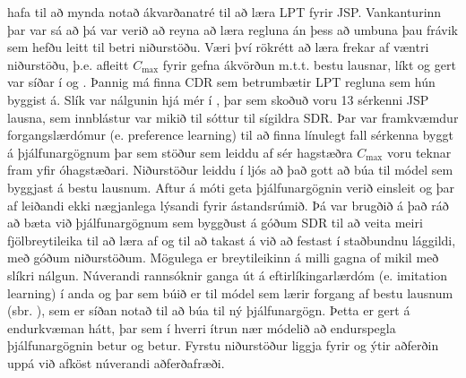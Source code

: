 \documentclass[10pt,a4paper]{article}
\begin{document}
\citet{Siggi05} hafa til að mynda notað ákvarðanatré til að læra LPT fyrir 
JSP. 
Vankanturinn þar var sá að þá var verið að reyna að læra regluna án þess að 
umbuna þau frávik sem hefðu leitt til betri niðurstöðu. 
Væri því rökrétt að læra frekar af væntri niðurstöðu, þ.e. afleitt $C_{\max}$ 
fyrir gefna ákvörðun m.t.t. bestu lausnar, líkt og gert var síðar í 
\cite{Malik08,Russell09} og \cite{Siggi10}. Þannig má finna CDR sem betrumbætir 
LPT regluna sem hún byggist á. 
Slík var nálgunin hjá mér í \cite{InRu15a}, þar 
sem skoðuð voru 13 sérkenni JSP lausna, sem innblástur var mikið til sóttur til 
sígildra SDR. Þar var framkvæmdur forgangslærdómur (e. preference learning) 
til að finna línulegt fall sérkenna byggt á þjálfunargögnum þar sem stöður sem 
leiddu af sér hagstæðra $C_{\max}$ voru teknar fram yfir óhagstæðari. 
Niðurstöður leiddu í ljós að það gott að búa til módel sem byggjast á bestu 
lausnum. Aftur á móti geta þjálfunargögnin verið einsleit og þar af leiðandi 
ekki nægjanlega lýsandi fyrir ástandsrúmið. 
Þá var brugðið á það ráð að bæta við þjálfunargögnum sem byggðust á 
góðum SDR til að veita meiri fjölbreytileika til að læra af og til að takast á 
við að festast í staðbundnu lággildi, með góðum niðurstöðum. 
Mögulega er breytileikinn á milli gagna of mikil með slíkri nálgun. 
Núverandi rannsóknir ganga út á eftirlíkingarlærdóm (e. imitation learning) í 
anda \cite{RossB10} og \cite{RossGB11} þar sem búið er til módel sem lærir 
forgang af bestu lausnum (sbr. \cite{InRu11a,InRu15a}), sem er síðan notað til 
að búa til ný þjálfunargögn. 
Þetta er gert á endurkvæman hátt, þar sem í hverri ítrun nær módelið að 
endurspegla þjálfunargögnin betur og betur. 
Fyrstu niðurstöður liggja fyrir og ýtir aðferðin uppá við afköst núverandi 
aðferðafræði. 

\end{document}
